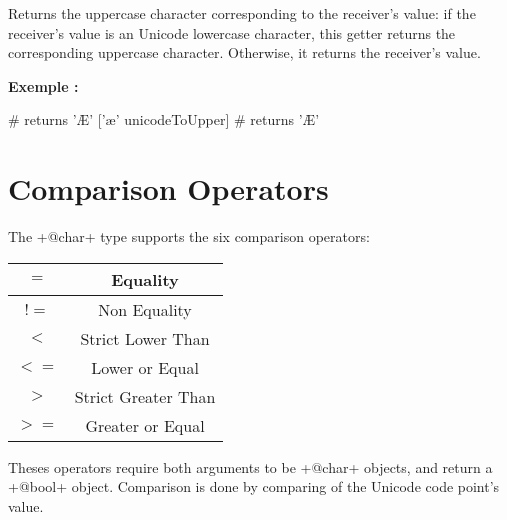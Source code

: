 Returns the uppercase character corresponding to the receiver's value: if the receiver's value is an Unicode lowercase character, this getter returns the corresponding uppercase character. Otherwise, it returns the receiver's value.

\textbf{Exemple :}
\begin{galgas}
['Æ' unicodeToUpper] # returns 'Æ'
['æ' unicodeToUpper] # returns 'Æ'
\end{galgas}





\section{Comparison Operators}

The \ggs+@char+ type supports the six comparison operators:\newline

\begin{tabular}{|c|c|}
\hline
$=$ & Equality \\
\hline
$!=$ & Non Equality \\
\hline
$<$  & Strict Lower Than \\
\hline
$<=$  & Lower or Equal \\
\hline
$>$  & Strict Greater Than \\
\hline
$>=$  & Greater or Equal \\
\hline
\end{tabular}

Theses operators require both arguments to be \ggs+@char+ objects, and return a \ggs+@bool+ object. Comparison is done by comparing of the Unicode code point's value.


